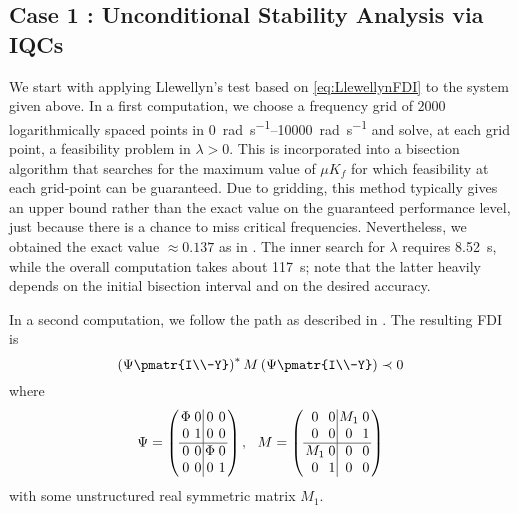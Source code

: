 \subsection{Case 1 : Unconditional Stability Analysis via IQCs}\label{sec:numcase1}
We start with applying Llewellyn's test based on \eqref{eq:LlewellynFDI} to the system given 
above. In a first computation, we choose a frequency grid of $2000$ logarithmically spaced 
points in \SIrange{0}{10000}{\radian\per\second} and solve, at each grid point, 
a feasibility problem in $\lambda>0$. This is incorporated into a bisection algorithm that 
searches for the maximum value of $\mu K_f$ for which feasibility at each grid-point can be 
guaranteed. Due to gridding, this method typically gives an upper bound rather than the exact 
value on the guaranteed performance level, just because there is a chance to miss critical 
frequencies. Nevertheless, we obtained the exact value $\approx 0.137$ as in  \cite{willaert}. 
The inner search for $\lambda$ requires \SI{8.52}{\second}, while the overall computation 
takes about \SI{117}{\second}; note that the latter heavily depends on the initial bisection 
interval and on the desired accuracy.

In a second computation, we follow the path as described in . The resulting FDI is
\begin{equation} \left(\Psi \pmatr{I\\-Y}\right)^* M
\left(\Psi \pmatr{I\\-Y}\right)\prec 0\label{eq:numcase1FDI}
\end{equation}
where
\begin{equation}
\arraycolsep0.3ex
\Psi = \left (\begin{array}{cc|cc}\Phi &0&0&0\\0&1&0&0\\\hline 0&0&\Phi&0\\0&0&0&1
\end{array}\right ),\ \
{M} = \left(\begin{array}{cc|cc}
	 0&0 &M_1 &0\\
	 0&0&0&1\\\hline
	 M_1&0&0&0\\
	 0&1&0&0
\end{array}\right)
\label{eq:numcase1mult}
\end{equation}
with some unstructured real symmetric matrix $M_1$.

